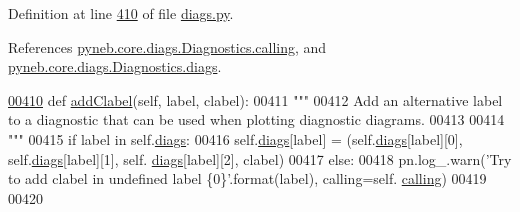Definition at line \hyperlink{diags_8py_source_l00410}{410} of file \hyperlink{diags_8py_source}{diags.\+py}.



References \hyperlink{diags_8py_source_l00169}{pyneb.\+core.\+diags.\+Diagnostics.\+calling}, and \hyperlink{diags_8py_source_l00173}{pyneb.\+core.\+diags.\+Diagnostics.\+diags}.


\begin{DoxyCode}
\hypertarget{classpyneb_1_1core_1_1diags_1_1_diagnostics_l00410}{}\hyperlink{classpyneb_1_1core_1_1diags_1_1_diagnostics_a4215075075b04c31b533a1a5c61ddd8b}{00410}     \textcolor{keyword}{def }\hyperlink{classpyneb_1_1core_1_1diags_1_1_diagnostics_a4215075075b04c31b533a1a5c61ddd8b}{addClabel}(self, label, clabel):
00411         \textcolor{stringliteral}{"""}
00412 \textcolor{stringliteral}{        Add an alternative label to a diagnostic that can be used when plotting diagnostic diagrams.}
00413 \textcolor{stringliteral}{        }
00414 \textcolor{stringliteral}{        """}
00415         \textcolor{keywordflow}{if} label \textcolor{keywordflow}{in} self.\hyperlink{classpyneb_1_1core_1_1diags_1_1_diagnostics_a0c0f7e36097677f61a6a14a0c3127b02}{diags}:
00416             self.\hyperlink{classpyneb_1_1core_1_1diags_1_1_diagnostics_a0c0f7e36097677f61a6a14a0c3127b02}{diags}[label] = (self.\hyperlink{classpyneb_1_1core_1_1diags_1_1_diagnostics_a0c0f7e36097677f61a6a14a0c3127b02}{diags}[label][0], self.\hyperlink{classpyneb_1_1core_1_1diags_1_1_diagnostics_a0c0f7e36097677f61a6a14a0c3127b02}{diags}[label][1], self.
      \hyperlink{classpyneb_1_1core_1_1diags_1_1_diagnostics_a0c0f7e36097677f61a6a14a0c3127b02}{diags}[label][2], clabel)
00417         \textcolor{keywordflow}{else}:
00418             pn.log\_.warn(\textcolor{stringliteral}{'Try to add clabel in undefined label \{0\}'}.format(label), calling=self.
      \hyperlink{classpyneb_1_1core_1_1diags_1_1_diagnostics_a07dce673fec8b2383ef411ab94b0b2fe}{calling})
00419     
00420     
\end{DoxyCode}
\hypertarget{classpyneb_1_1core_1_1diags_1_1_diagnostics_a508fa9c5a2216f9eb4128338c33a6f75}{}
